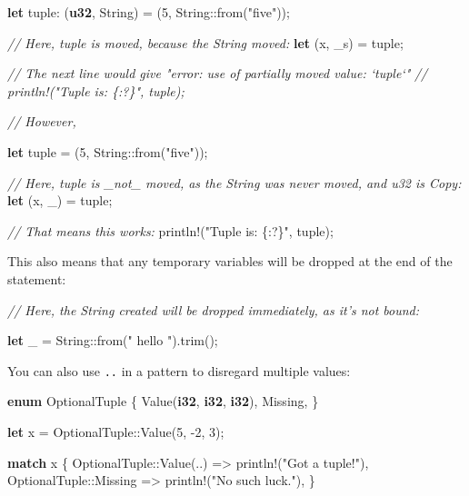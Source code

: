 \documentclass[a4paper,]{book}
\newenvironment{Shaded}{\begin{snugshade}}{\end{snugshade}}
\newcommand{\KeywordTok}[1]{\textcolor[rgb]{0.13,0.29,0.53}{\textbf{{#1}}}}
\newcommand{\DecValTok}[1]{\textcolor[rgb]{0.00,0.00,0.81}{{#1}}}
\newcommand{\StringTok}[1]{\textcolor[rgb]{0.31,0.60,0.02}{{#1}}}
\newcommand{\CommentTok}[1]{\textcolor[rgb]{0.56,0.35,0.01}{\textit{{#1}}}}
\newcommand{\OtherTok}[1]{\textcolor[rgb]{0.56,0.35,0.01}{{#1}}}
\newcommand{\NormalTok}[1]{{#1}}
\begin{document}
\begin{Shaded}
\begin{Highlighting}[]
\KeywordTok{let} \NormalTok{tuple: (}\KeywordTok{u32}\NormalTok{, String) = (}\DecValTok{5}\NormalTok{, String::from(}\StringTok{"five"}\NormalTok{));}

\CommentTok{// Here, tuple is moved, because the String moved:}
\KeywordTok{let} \NormalTok{(x, _s) = tuple;}

\CommentTok{// The next line would give "error: use of partially moved value: `tuple`"}
\CommentTok{// println!("Tuple is: \{:?\}", tuple);}

\CommentTok{// However,}

\KeywordTok{let} \NormalTok{tuple = (}\DecValTok{5}\NormalTok{, String::from(}\StringTok{"five"}\NormalTok{));}

\CommentTok{// Here, tuple is _not_ moved, as the String was never moved, and u32 is Copy:}
\KeywordTok{let} \NormalTok{(x, _) = tuple;}

\CommentTok{// That means this works:}
\OtherTok{println!}\NormalTok{(}\StringTok{"Tuple is: \{:?\}"}\NormalTok{, tuple);}
\end{Highlighting}
\end{Shaded}

This also means that any temporary variables will be dropped at the end
of the statement:

\begin{Shaded}
\begin{Highlighting}[]
\CommentTok{// Here, the String created will be dropped immediately, as it’s not bound:}

\KeywordTok{let} \NormalTok{_ = String::from(}\StringTok{"  hello  "}\NormalTok{).trim();}
\end{Highlighting}
\end{Shaded}

You can also use \texttt{..} in a pattern to disregard multiple values:

\begin{Shaded}
\begin{Highlighting}[]
\KeywordTok{enum} \NormalTok{OptionalTuple \{}
    \NormalTok{Value(}\KeywordTok{i32}\NormalTok{, }\KeywordTok{i32}\NormalTok{, }\KeywordTok{i32}\NormalTok{),}
    \NormalTok{Missing,}
\NormalTok{\}}

\KeywordTok{let} \NormalTok{x = OptionalTuple::Value(}\DecValTok{5}\NormalTok{, -}\DecValTok{2}\NormalTok{, }\DecValTok{3}\NormalTok{);}

\KeywordTok{match} \NormalTok{x \{}
    \NormalTok{OptionalTuple::Value(..) => }\OtherTok{println!}\NormalTok{(}\StringTok{"Got a tuple!"}\NormalTok{),}
    \NormalTok{OptionalTuple::Missing => }\OtherTok{println!}\NormalTok{(}\StringTok{"No such luck."}\NormalTok{),}
\NormalTok{\}}
\end{Highlighting}
\end{Shaded}
\end{document}
